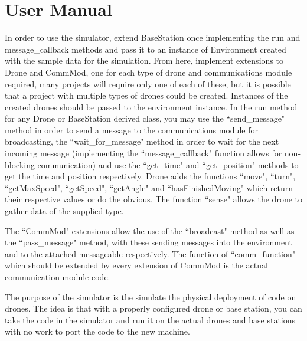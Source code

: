 \section{User Manual}
	In order to use the simulator, extend BaseStation once implementing the run and message\_callback methods and pass it to an
	instance of Environment created with the sample data for the simulation. From here, implement extensions to Drone and CommMod,
	one for each type of drone and communications module required, many projects will require only one of each of these, but it is
	possible that a project with multiple types of drones could be created. Instances of the created drones should be passed to
	the environment instance. In the run method for any Drone or BaseStation derived class, you may use the ``send\_message" method
	in order to send a message to the communications module for broadcasting, the ``wait\_for\_message" method in order to wait for
	the next incoming message (implementing the ``message\_callback" function allows for non-blocking communication) and use the
	``get\_time" and ``get\_position" methods to get the time and position respectively. Drone adds the functions ``move", ``turn",
	``getMaxSpeed", ``getSpeed", ``getAngle" and ``hasFinishedMoving" which return their respective values or do the obvious. The
	function ``sense" allows the drone to gather data of the supplied type.

	The ``CommMod" extensions allow the use of the ``broadcast" method as well as the ``pass\_message" method, with these sending
	messages into the environment and to the attached messageable respectively. The function of ``comm\_function" which should be
	extended by every extension of CommMod is the actual communication module code.

	The purpose of the simulator is the simulate the physical deployment of code on drones. The idea is that with a properly
	configured drone or base station, you can take the code in the simulator and run it on the actual drones and base stations
	with no work to port the code to the new machine.
